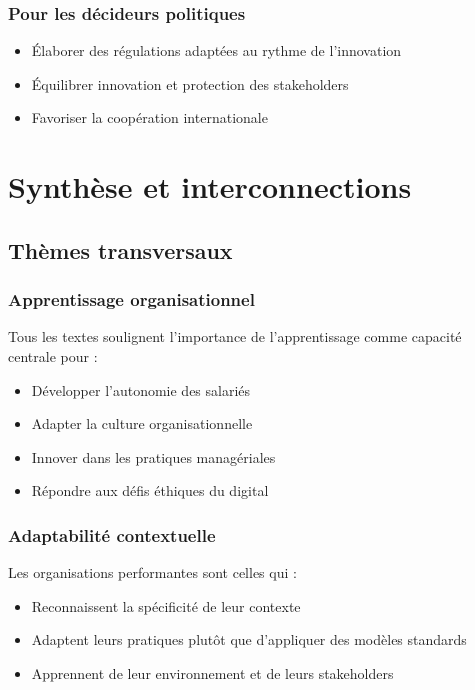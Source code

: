 \documentclass[12pt,a4paper]{article}
\begin{document}
\subsubsection{Pour les décideurs politiques}
\begin{itemize}
    \item Élaborer des régulations adaptées au rythme de l'innovation
    \item Équilibrer innovation et protection des stakeholders
    \item Favoriser la coopération internationale
\end{itemize}

\section{Synthèse et interconnections}

\subsection{Thèmes transversaux}

\subsubsection{Apprentissage organisationnel}
Tous les textes soulignent l'importance de l'apprentissage comme capacité centrale pour :
\begin{itemize}
    \item Développer l'autonomie des salariés
    \item Adapter la culture organisationnelle
    \item Innover dans les pratiques managériales
    \item Répondre aux défis éthiques du digital
\end{itemize}

\subsubsection{Adaptabilité contextuelle}
Les organisations performantes sont celles qui :
\begin{itemize}
    \item Reconnaissent la spécificité de leur contexte
    \item Adaptent leurs pratiques plutôt que d'appliquer des modèles standards
    \item Apprennent de leur environnement et de leurs stakeholders
\end{itemize}
\end{document}
